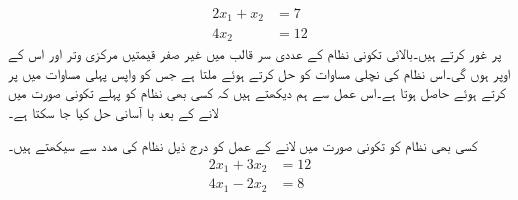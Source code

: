 \begin{align*}
2x_1+x_2&=7\\
4x_2&=12
\end{align*}
پر غور کرتے ہیں۔بالائی تکونی نظام کے عددی سر قالب میں غیر صفر قیمتیں مرکزی وتر اور اس کے اوپر ہوں گی۔اس نظام کی نچلی مساوات کو حل کرتے ہوئے  ملتا ہے جس کو واپس پہلی مساوات میں پر کرتے ہوئے  حاصل ہوتا ہے۔اس عمل سے ہم دیکھتے ہیں کہ کسی بھی نظام  کو پہلے تکونی صورت میں لانے کے بعد با آسانی حل کیا جا سکتا ہے۔

کسی بھی نظام کو تکونی صورت میں لانے کے عمل کو درج ذیل نظام کی مدد سے سیکھتے ہیں۔
\begin{align*}
2x_1+3x_2&=12\\
4x_1-2x_2&=8
\end{align*} 

